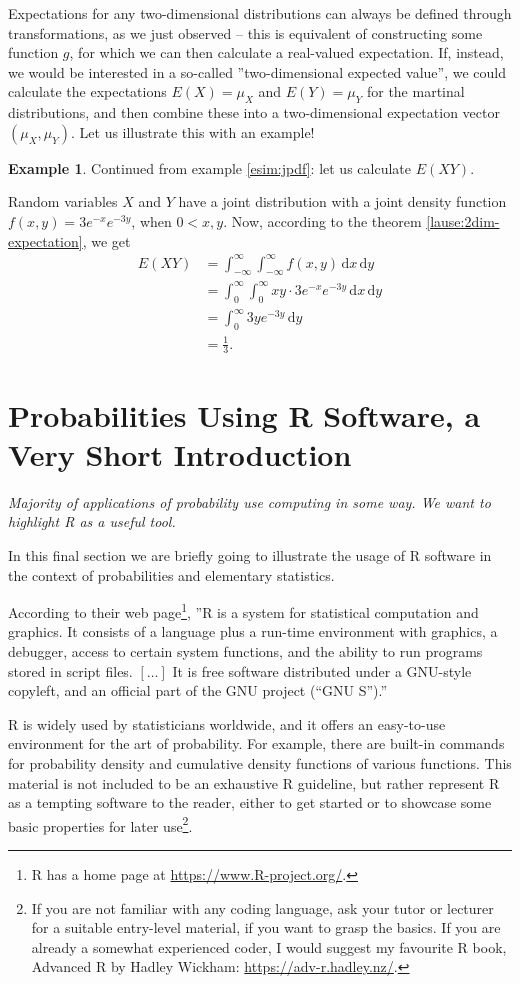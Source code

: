 \documentclass[12pt,a4paper,leqno]{report}
\newcommand{\dif}{\,\mathrm{d}}
\theoremstyle{plain}
\theoremstyle{definition}
\newtheorem{esim}[equation]{Example}
\begin{document}
Expectations for any two-dimensional distributions can always be defined through transformations, as we just observed -- this is equivalent of constructing some function $g$, for which we can then calculate a real-valued expectation. If, instead, we would be interested in a so-called ''two-dimensional expected value'', we could calculate the expectations $E(X) = \mu_X$ and $E(Y) = \mu_Y$ for the martinal distributions, and then combine these into a two-dimensional expectation vector $(\mu_X, \mu_Y)$. Let us illustrate this with an example! 

\begin{esim} \label{esim:jpdf2}
Continued from example \ref{esim:jpdf}: let us calculate $E(XY)$.

Random variables $X$ and $Y$ have a joint distribution with a joint density function $f(x,y) = 3e^{-x}e^{-3y}$, when $0 < x,y$. Now, according to the theorem \ref{lause:2dim-expectation}, we get
\[
\begin{split}
E(XY) &= \int_{-\infty}^\infty \int_{-\infty}^\infty f(x,y) \dif{x} \dif{y}  \\
&= \int_{0}^\infty \int_{0}^\infty xy \cdot 3e^{-x}e^{-3y} \dif{x} \dif{y} \\
&=  \int_0^\infty 3ye^{-3y} \dif{y} \\
&= \frac{1}{3}.
\end{split}
\]
\end{esim}

\section{Probabilities Using R Software, a Very Short Introduction}
\emph{Majority of applications of probability use computing in some way. We want to highlight R as a useful tool.}

In this final section we are briefly going to illustrate the usage of R software in the context of probabilities and elementary statistics.

According to their web page\footnote{R has a home page at \url{https://www.R-project.org/}.}, ''R is a system for statistical computation and graphics. It consists of a language plus a run-time environment with graphics, a debugger, access to certain system functions, and the ability to run programs stored in script files. $\left[ \ldots \right]$ It is free software distributed under a GNU-style copyleft, and an official part of the GNU project (“GNU S”).''

R is widely used by statisticians worldwide, and it offers an easy-to-use environment for the art of probability. For example, there are built-in commands for probability density and cumulative density functions of various functions. This material is not included to be an exhaustive R guideline, but rather represent R as a tempting software to the reader, either to get started or to showcase some basic properties for later use\footnote{If you are not familiar with any coding language, ask your tutor or lecturer for a suitable entry-level material, if you want to grasp the basics. If you are already a somewhat experienced coder, I would suggest my favourite R book, Advanced R by Hadley Wickham: \url{https://adv-r.hadley.nz/}.}.
\end{document}
